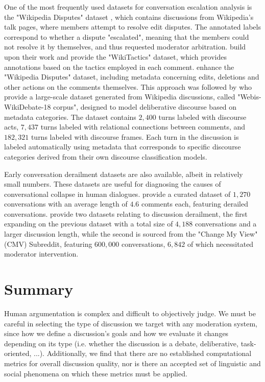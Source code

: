 One of the most frequently used datasets for conversation escalation analysis is the "Wikipedia Disputes" dataset \cite{de-kock-vlachos-2021-beg}, which contains discussions from Wikipedia's talk pages, where members attempt to resolve edit disputes. The annotated labels correspond to whether a dispute "escalated", meaning that the members could not resolve it by themselves, and thus requested moderator arbitration. \citet{dekock2022disagree} build upon their work and provide the "WikiTactics" dataset, which provides annotations based on the tactics employed in each comment. \citet{hua2018wikiconvcorpuscompleteconversational} enhance the "Wikipedia Disputes" dataset, including metadata concerning edits, deletions and other actions on the comments themselves. This approach was followed by \citet{al-khatib-etal-2018-modeling} who provide a large-scale dataset generated from Wikipedia discussions, called "Webis-WikiDebate-18 corpus", designed to model deliberative discourse based on metadata categories. The dataset contains $2,400$ turns labeled with discourse acts, $7,437$ turns labeled with relational connections between comments, and $182,321$ turns labeled with discourse frames. Each turn in the discussion is labeled automatically using metadata that corresponds to specific discourse categories derived from their own discourse classification models.

Early conversation derailment datasets are also available, albeit in relatively small numbers. These datasets are useful for diagnosing the causes of conversational collapse in human dialogues. \citet{zhang-2018-gone-awry} provide a curated dataset of $1,270$ conversations with an average length of $4.6$ comments each, featuring derailed conversations. \citet{chang-danescu-niculescu-mizil-2019-trouble} provide two datasets relating to discussion derailment, the first expanding on the previous dataset with a total size of $4,188$ conversations and a larger discussion length, while the second is sourced from the "Change My View" (CMV) Subreddit, featuring $600,000$ conversations, $6,842$ of which necessitated moderator intervention.


\section{Summary}

Human argumentation is complex and difficult to objectively judge. We must be careful in selecting the type of discussion we target with any moderation system, since how we define a discussion's goals and how we evaluate it changes depending on  its type (i.e. whether the discussion is a debate, deliberative, task-oriented, ...). Additionally, we find that there are no established computational metrics for overall discussion quality, nor is there an accepted set of linguistic and social phenomena on which these metrics must be applied.

